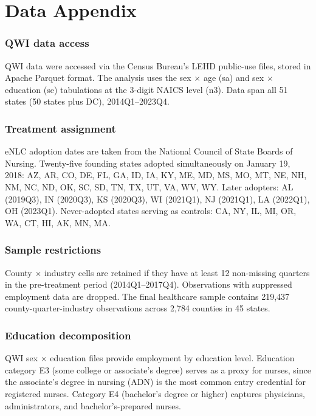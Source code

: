 \documentclass[12pt]{article}
\begin{document}
\section{Data Appendix}
\label{sec:data_appendix}

\subsubsection*{QWI data access} QWI data were accessed via the Census Bureau's LEHD public-use files, stored in Apache Parquet format. The analysis uses the sex $\times$ age (sa) and sex $\times$ education (se) tabulations at the 3-digit NAICS level (n3). Data span all 51 states (50 states plus DC), 2014Q1--2023Q4.

\subsubsection*{Treatment assignment} eNLC adoption dates are taken from the National Council of State Boards of Nursing. Twenty-five founding states adopted simultaneously on January 19, 2018: AZ, AR, CO, DE, FL, GA, ID, IA, KY, ME, MD, MS, MO, MT, NE, NH, NM, NC, ND, OK, SC, SD, TN, TX, UT, VA, WV, WY. Later adopters: AL (2019Q3), IN (2020Q3), KS (2020Q3), WI (2021Q1), NJ (2021Q1), LA (2022Q1), OH (2023Q1). Never-adopted states serving as controls: CA, NY, IL, MI, OR, WA, CT, HI, AK, MN, MA.

\subsubsection*{Sample restrictions} County $\times$ industry cells are retained if they have at least 12 non-missing quarters in the pre-treatment period (2014Q1--2017Q4). Observations with suppressed employment data are dropped. The final healthcare sample contains 219,437 county-quarter-industry observations across 2,784 counties in 45 states.

\subsubsection*{Education decomposition} QWI sex $\times$ education files provide employment by education level. Education category E3 (some college or associate's degree) serves as a proxy for nurses, since the associate's degree in nursing (ADN) is the most common entry credential for registered nurses. Category E4 (bachelor's degree or higher) captures physicians, administrators, and bachelor's-prepared nurses.
\end{document}
